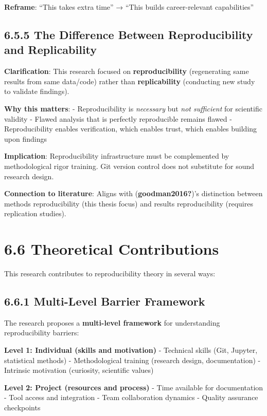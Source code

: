 \documentclass[
  oneside,
  open=any]{scrbook}
\begin{document}
\textbf{Reframe}: ``This takes extra time'' → ``This builds
career-relevant capabilities''

\subsection{6.5.5 The Difference Between Reproducibility and
Replicability}\label{the-difference-between-reproducibility-and-replicability}

\textbf{Clarification}: This research focused on
\textbf{reproducibility} (regenerating same results from same data/code)
rather than \textbf{replicability} (conducting new study to validate
findings).

\textbf{Why this matters}: - Reproducibility is \emph{necessary} but
\emph{not sufficient} for scientific validity - Flawed analysis that is
perfectly reproducible remains flawed - Reproducibility enables
verification, which enables trust, which enables building upon findings

\textbf{Implication}: Reproducibility infrastructure must be
complemented by methodological rigor training. Git version control does
not substitute for sound research design.

\textbf{Connection to literature}: Aligns with (\textbf{goodman2016?})'s
distinction between methods reproducibility (this thesis focus) and
results reproducibility (requires replication studies).

\section{6.6 Theoretical Contributions}\label{theoretical-contributions}

This research contributes to reproducibility theory in several ways:

\subsection{6.6.1 Multi-Level Barrier
Framework}\label{multi-level-barrier-framework}

The research proposes a \textbf{multi-level framework} for understanding
reproducibility barriers:

\textbf{Level 1: Individual (skills and motivation)} - Technical skills
(Git, Jupyter, statistical methods) - Methodological training (research
design, documentation) - Intrinsic motivation (curiosity, scientific
values)

\textbf{Level 2: Project (resources and process)} - Time available for
documentation - Tool access and integration - Team collaboration
dynamics - Quality assurance checkpoints
\end{document}
